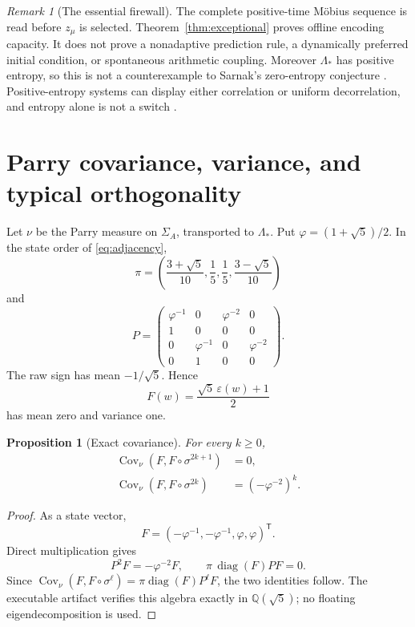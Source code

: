 \documentclass[11pt,a4paper]{article}
\newtheorem{proposition}[theorem]{Proposition}
\theoremstyle{remark}
\newtheorem{remark}[theorem]{Remark}
\newcommand{\Mob}{\mu}
\newcommand{\Lam}{\Lambda_*}
\newcommand{\eps}{\varepsilon}
\newcommand{\Cov}{\operatorname{Cov}}
\begin{document}
\begin{remark}[The essential firewall]
The complete positive-time M\"obius sequence is read before $z_{\Mob}$ is
selected.  Theorem~\ref{thm:exceptional} proves offline encoding capacity.  It
does not prove a nonadaptive prediction rule, a dynamically preferred initial
condition, or spontaneous arithmetic coupling.  Moreover $\Lam$ has positive
entropy, so this is not a counterexample to Sarnak's zero-entropy conjecture
\cite{Sarnak2010}.  Positive-entropy systems can display either correlation or
uniform decorrelation, and entropy alone is not a switch
\cite{Karagulyan2017,DownarowiczSerafin2019}.
\end{remark}

\section{Parry covariance, variance, and typical orthogonality}

Let $\nu$ be the Parry measure on $\Sigma_A$, transported to $\Lam$.  Put
$\varphi=(1+\sqrt5)/2$.  In the state order of \eqref{eq:adjacency},
\begin{equation}
 \pi=\left(\frac{3+\sqrt5}{10},\frac15,\frac15,
            \frac{3-\sqrt5}{10}\right)
 \label{eq:parry-pi}
\end{equation}
and
\begin{equation}
 P=\begin{pmatrix}
 \varphi^{-1}&0&\varphi^{-2}&0\\
 1&0&0&0\\
 0&\varphi^{-1}&0&\varphi^{-2}\\
 0&1&0&0
 \end{pmatrix}.
 \label{eq:parry-P}
\end{equation}
The raw sign has mean $-1/\sqrt5$.  Hence
\begin{equation}
 F(w)=\frac{\sqrt5\,\eps(w)+1}{2}
 \label{eq:F}
\end{equation}
has mean zero and variance one.

\begin{proposition}[Exact covariance]
\label{prop:covariance}
For every $k\geq0$,
\begin{align}
 \Cov_\nu(F,F\circ\sigma^{2k+1})&=0,\label{eq:odd-cov}\\
 \Cov_\nu(F,F\circ\sigma^{2k})&=(-\varphi^{-2})^k.\label{eq:even-cov}
\end{align}
\end{proposition}

\begin{proof}
As a state vector,
\[
 F=(-\varphi^{-1},-\varphi^{-1},\varphi,\varphi)^{\mathsf T}.
\]
Direct multiplication gives
\begin{equation}
 P^2F=-\varphi^{-2}F,
 \qquad
 \pi\,\operatorname{diag}(F)PF=0.
 \label{eq:cov-algebra}
\end{equation}
Since
$\Cov_\nu(F,F\circ\sigma^\ell)=
 \pi\operatorname{diag}(F)P^\ell F$, the two identities follow.  The
executable artifact verifies this algebra exactly in $\mathbb Q(\sqrt5)$;
no floating eigendecomposition is used.
\end{proof}
\end{document}
